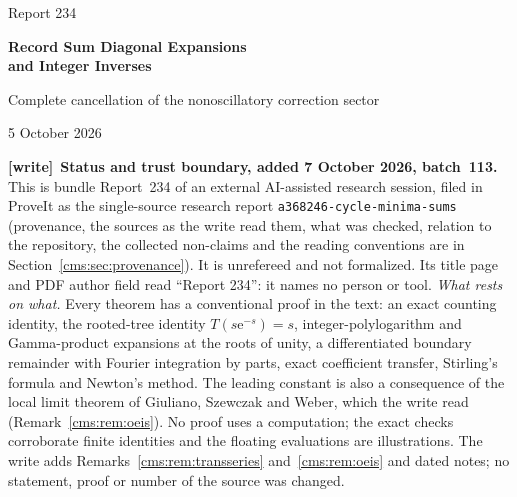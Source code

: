 \documentclass[11pt,letterpaper]{article}
\numberwithin{equation}{section}
\theoremstyle{definition}\newtheorem{definition}[theorem]{Definition}
\theoremstyle{remark}\newtheorem{remark}[theorem]{Remark}
\newcommand{\ee}{\mathrm e}
\newcommand{\ii}{\mathrm i}
\newcommand{\file}[1]{\nolinkurl{#1}}
\newenvironment{writenote}[1][]{\par\smallskip\begingroup\small
 \noindent\textbf{[write]}\if\relax\detokenize{#1}\relax\else~\textbf{#1.}\fi\ }%
 {\par\endgroup\smallskip}
\begin{document}
\begin{center}
{\large Report 234}\par\vspace{8pt}
{\LARGE\bfseries Record Sum Diagonal Expansions\\[5pt] and Integer Inverses}\par\vspace{8pt}
{\large Complete cancellation of the nonoscillatory correction sector}\par\vspace{7pt}
5 October 2026
\end{center}
\begin{abstract}
Let $a_n$ count permutations of $\{1,\ldots,n\}$ whose cycle minima sum to $n$. The same numbers count permutations whose record positions sum to $n$ and form OEIS A368246. For $b_n=a_n/(n-1)!$, we prove a finite expansion to every fixed inverse-power order. The constant is $\ee^{-\gamma}$, the term of order $n^{-1}$ is absent, and every subsequent coefficient is a polynomial in $\log n$ with periodic coefficients of mean zero. The reason is the exact rooted-tree identity $T(s\ee^{-s})=s$, which cancels all higher logarithms at the positive singularity of a shifted infinite product. We give the second- and third-order terms, Gamma-product root amplitudes, the exceptional delay caused by zeros at $\pm\ii$, a direct global boundary remainder, and a real finite Newton construction with a rigorous two-ceiling inverse envelope. The method and the leading constant are classical; the focus is the sequence-specific cancellation and its refinements. Numerical checks are separated from the analytic proof, and no effective remainder constant, convergence of an infinite transseries, or publication-priority claim is made.
\end{abstract}
\begin{writenote}[Status and trust boundary, added 7 October 2026, batch~113]
This is bundle Report~234 of an external AI-assisted research session, filed
in ProveIt as the single-source research report
\file{a368246-cycle-minima-sums} (provenance, the sources as the write read
them, what was checked, relation to the repository, the collected non-claims
and the reading conventions are in Section~\ref{cms:sec:provenance}). It is
unrefereed and not formalized. Its title page and PDF author field read
``Report 234'': it names no person or tool. \emph{What rests on what.} Every
theorem has a conventional proof in the text: an exact counting identity, the
rooted-tree identity $T(s\ee^{-s})=s$, integer-polylogarithm and Gamma-product
expansions at the roots of unity, a differentiated boundary remainder with
Fourier integration by parts, exact coefficient transfer, Stirling's formula
and Newton's method. The leading constant is also a consequence of the local
limit theorem of Giuliano, Szewczak and Weber, which the write read
(Remark~\ref{cms:rem:oeis}). No proof uses a computation; the exact checks
corroborate finite identities and the floating evaluations are illustrations.
The write adds Remarks~\ref{cms:rem:transseries} and~\ref{cms:rem:oeis} and
dated notes; no statement, proof or number of the source was changed.
\end{writenote}
\end{document}
